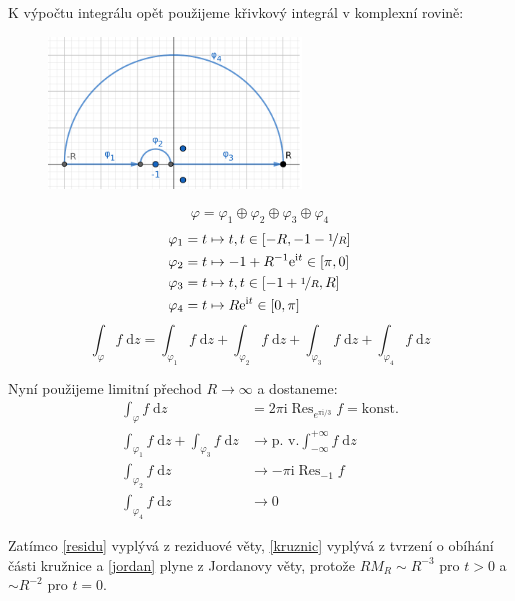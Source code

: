 \documentclass[10pt,a4paper]{article}
\newcommand{\const}[1]{\text{#1}}
\newcommand{\Res}{\operatorname{Res}}
\renewcommand{\d}[1]{\;\const{d}#1}
\newcommand{\e}[1]{\const{e}^{#1}}
\renewcommand{\i}{\const{i}}
\begin{document}
K výpočtu integrálu opět použijeme křivkový integrál v komplexní rovině:

\begin{figure}[H]
    \centering
    \includegraphics[width=0.6\textwidth]{du2u2param.pdf}
    \label{obr:du2u2param}
\end{figure}
\begin{equation*}
    \varphi = \varphi_1 \oplus \varphi_2 \oplus \varphi_3 \oplus \varphi_4
\end{equation*}
\begin{align*}
    \varphi_1 &= t \mapsto t, t \in [-R, -1 - \nicefrac{1}{R}] \\
    \varphi_2 &= t \mapsto -1 + R^{-1} \e{\i t} \in [\pi, 0] \\
    \varphi_3 &= t \mapsto t, t \in [-1+\nicefrac{1}{R}, R] \\
    \varphi_4 &= t \mapsto R \e{\i t} \in [0, \pi]
\end{align*}
\begin{equation*}
    \int_\varphi f \d{z}
    = \int_{\varphi_1} f \d{z}
    + \int_{\varphi_2} f \d{z}
    + \int_{\varphi_3} f \d{z}
    + \int_{\varphi_4} f \d{z}
\end{equation*}

Nyní použijeme limitní přechod $R\to\infty$ a dostaneme:
\begin{align}
    \int_\varphi f \d{z}
    &= 2\pi\i \Res_{e^{\pi\i/3}} f = \const{konst.}
    \label{residu}
    \\[5pt]
    \int_{\varphi_1} f \d{z} + \int_{\varphi_3} f \d{z}
    &\to \const{p. v.} \int_{-\infty}^{+\infty} f \d{z}
    \\[5pt]
    \int_{\varphi_2} f \d{z} &\to -\pi\i \Res_{-1} f
    \label{kruznic}
    \\[5pt]
    \int_{\varphi_4} f \d{z} &\to 0
    \label{jordan}
\end{align}

Zatímco \eqref{residu} vyplývá z reziduové věty, \eqref{kruznic} vyplývá z tvrzení o obíhání části kružnice a \eqref{jordan} plyne z Jordanovy věty, protože $RM_R \sim R^{-3}$ pro $t>0$ a $\sim R^{-2}$ pro $t = 0$.
\end{document}
